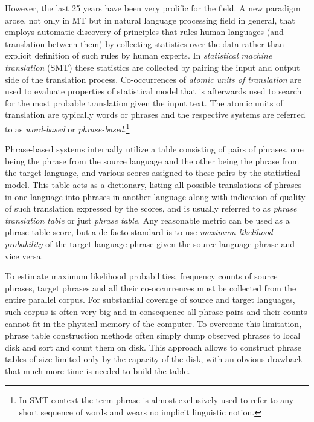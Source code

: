 However, the last 25 years have been very prolific for the field.
A new paradigm arose, not only in MT but in natural language processing
field in general, that employs automatic discovery of principles that
rules human languages (and translation between them) by collecting
statistics over the data rather than explicit definition of such rules
by human experts.
In \emph{statistical machine translation} (SMT) these statistics are
collected by pairing the input and output side of the translation process.
Co-occurrences of \emph{atomic units of translation} are used to
evaluate properties of statistical model that is afterwards used to
search for the most probable translation given the input text.
The atomic units of translation are typically words or phrases and
the respective systems are referred to as \emph{word-based} or
\emph{phrase-based}.\footnote{In SMT context the term phrase is almost
exclusively used to refer to any short sequence of words and wears no
implicit linguistic notion.}

Phrase-based systems internally utilize a table consisting of pairs of
phrases, one being the phrase from the source language and the other
being the phrase from the target language, and various scores assigned to
these pairs by the statistical model.
This table acts as a dictionary, listing all possible translations of phrases
in one language into phrases in another language along with indication of
quality of such translation expressed by the scores, and is usually referred
to as \emph{phrase translation table} or just \emph{phrase table}.
Any reasonable metric can be used as a phrase table score, but a de facto
standard is to use \emph{maximum likelihood probability} of the target language
phrase given the source language phrase and vice versa.

To estimate maximum likelihood probabilities, frequency counts of source
phrases, target phrases and all their co-occurrences must be collected from
the entire parallel corpus.
For substantial coverage of source and target languages, such corpus is often
very big and in consequence all phrase pairs and their counts cannot fit in
the physical memory of the computer.
To overcome this limitation, phrase table construction methods often simply
dump observed phrases to local disk and sort and count them on disk.
This approach allows to construct phrase tables of size limited only by
the capacity of the disk, with an obvious drawback that much more time is
needed to build the table.

